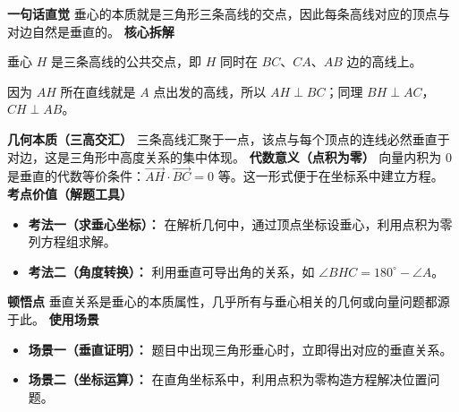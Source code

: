 \begin{explanationbox}
	\textbf{\textcolor{CExplanation}{一句话直觉}}
	垂心的本质就是三角形三条高线的交点，因此每条高线对应的顶点与对边自然是垂直的。
	\medskip
	\textbf{\textcolor{CExplanation}{核心拆解}}
	\begin{description}[style=nextline, leftmargin=2.8em, labelsep=0.5em, itemsep=0.45em]
		\item[\textbf{要点一（垂心定义）：}] 垂心 $H$ 是三条高线的公共交点，即 $H$ 同时在 $BC$、$CA$、$AB$ 边的高线上。
		\item[\textbf{要点二（垂直传递）：}] 因为 $AH$ 所在直线就是 $A$ 点出发的高线，所以 $AH\perp BC$；同理 $BH\perp AC$，$CH\perp AB$。
	\end{description}
	\medskip
	\textbf{\textcolor{CExplanation}{几何本质（三高交汇）}}
	三条高线汇聚于一点，该点与每个顶点的连线必然垂直于对边，这是三角形中高度关系的集中体现。
	\medskip
	\textbf{\textcolor{CExplanation}{代数意义（点积为零）}}
	向量内积为 $0$ 是垂直的代数等价条件：$\overrightarrow{AH}\cdot\overrightarrow{BC}=0$ 等。这一形式便于在坐标系中建立方程。
	\medskip
	\textbf{\textcolor{CExplanation}{考点价值（解题工具）}}
	\begin{itemize}[leftmargin=*, itemsep=0.5em, topsep=0.4em]
		\item \textbf{考法一（求垂心坐标）：} 在解析几何中，通过顶点坐标设垂心，利用点积为零列方程组求解。
		\item \textbf{考法二（角度转换）：} 利用垂直可导出角的关系，如 $\angle BHC=180^\circ-\angle A$。
	\end{itemize}
	\medskip
	\textbf{\textcolor{CExplanation}{顿悟点}}
	垂直关系是垂心的本质属性，几乎所有与垂心相关的几何或向量问题都源于此。
	\medskip
	\textbf{\textcolor{CExplanation}{使用场景}}
	\begin{itemize}[leftmargin=*, itemsep=0.5em, topsep=0.4em]
		\item \textbf{场景一（垂直证明）：} 题目中出现三角形垂心时，立即得出对应的垂直关系。
		\item \textbf{场景二（坐标运算）：} 在直角坐标系中，利用点积为零构造方程解决位置问题。
	\end{itemize}
\end{explanationbox}
